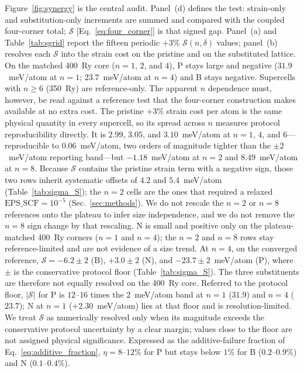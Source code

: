 \documentclass[%
 reprint,
 groupedaddress,
 amsmath,amssymb,
 aps,
 prb,
 floatfix,
]{revtex4-2}
\begin{document}


Figure~\ref{fig:synergy} is the central audit.
Panel~(d) defines the test: strain-only and substitution-only increments are summed and compared with the coupled four-corner total; $\mathcal{S}$ [Eq.~\eqref{eq:four_corner}] is that signed gap.
Panel~(a) and Table~\ref{tab:sgrid} report the fifteen periodic $+3$\% $\mathcal{S}(n,\delta)$ values; panel~(b) resolves each $\mathcal{S}$ into the strain cost on the pristine and on the substituted lattice.
On the matched 400~Ry core ($n{=}1$, $2$, and $4$), P stays large and negative ($31.9$~meV/atom at $n{=}1$; $23.7$~meV/atom at $n{=}4$) and B stays negative. Supercells with $n\geq 6$ (350~Ry) are reference-only.
The apparent $n$ dependence must, however, be read against a reference test that the four-corner construction makes available at no extra cost.
The pristine $+3$\% strain cost per atom is the same physical quantity in every supercell, so its spread across $n$ measures protocol reproducibility directly.
It is $2.99$, $3.05$, and $3.10$~meV/atom at $n{=}1$, $4$, and $6$---reproducible to $0.06$~meV/atom, two orders of magnitude tighter than the $\pm 2$~meV/atom reporting band---but $-1.18$~meV/atom at $n{=}2$ and $8.49$~meV/atom at $n{=}8$.
Because $\mathcal{S}$ contains the pristine strain term with a negative sign, those two rows inherit systematic offsets of $4.2$ and $5.4$~meV/atom (Table~\ref{tab:sigma_S}); the $n{=}2$ cells are the ones that required a relaxed $\mathrm{EPS\_SCF}=10^{-5}$ (Sec.~\ref{sec:methods}).
We do not rescale the $n{=}2$ or $n{=}8$ references onto the plateau to infer size independence, and we do not remove the $n{=}8$ sign change by that rescaling.
N is small and positive only on the plateau-matched 400~Ry corners ($n{=}1$ and $n{=}4$); the $n{=}2$ and $n{=}8$ rows stay reference-limited and are not evidence of a size trend.
At $n{=}4$, on the converged reference, $\mathcal{S}=-6.2\pm 2$ (B), $+3.0\pm 2$ (N), and $-23.7\pm 2$~meV/atom (P), where $\pm$ is the conservative protocol floor (Table~\ref{tab:sigma_S}).
The three substituents are therefore not equally resolved on the 400~Ry core.
Referred to the protocol floor, $|\mathcal{S}|$ for P is $12$--$16$ times the $2$~meV/atom band at $n{=}1$ ($31.9$) and $n{=}4$ ($23.7$); N at $n{=}1$ ($+2.30$~meV/atom) lies at that floor and is resolution-limited.
We treat $\mathcal{S}$ as numerically resolved only when its magnitude exceeds the conservative protocol uncertainty by a clear margin; values close to the floor are not assigned physical significance.
Expressed as the additive-failure fraction of Eq.~\eqref{eq:additive_fraction}, $\eta=8$--$12$\% for P but stays below $1$\% for B ($0.2$--$0.9$\%) and N ($0.1$--$0.4$\%).
\end{document}
